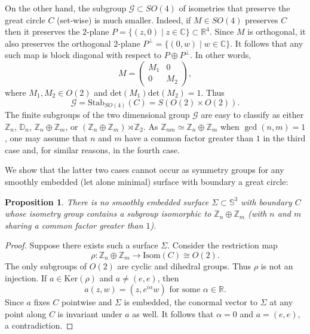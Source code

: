 \documentclass[11pt, reqno]{amsart}
\newtheorem{prop}[thm]{Proposition}
\numberwithin{equation}{section}
\begin{document}
On the other hand, the subgroup $\mathcal{G}\subset SO(4)$ of isometries that preserve the great circle $C$ (set-wise) is much smaller.   Indeed, if $M\in SO(4)$ preserves $C$ then it preserves the $2$-plane $P=\{(z,0)\;|\;z\in\mathbb{C}\}\subset\mathbb{R}^4$.  Since $M$ is orthogonal, it also preserves the orthogonal $2$-plane $P^\perp =\{(0,w)\;|\;w\in\mathbb{C}\}$.  It follows that any such map is block diagonal with respect to $P\oplus P^\perp$.  In other words, 
\begin{equation}
M =
\begin{pmatrix}
M_1 & 0 \\
0 & M_2
\end{pmatrix},
\end{equation}
where $M_1,M_2\in O(2)$ and $\mbox{det}(M_1)\mbox{det}(M_2)=1$.
Thus
\begin{equation}
\mathcal{G}=\mbox{Stab}_{SO(4)}(C) = S(O(2)\times O(2)).
\end{equation}
The finite subgroups of the two dimensional group $\mathcal{G}$ are easy to classify as either $\mathbb{Z}_n$, $\mathbb{D}_n$, $\mathbb{Z}_n\oplus\mathbb{Z}_m$, or $(\mathbb{Z}_n\oplus\mathbb{Z}_m)\rtimes\mathbb{Z}_2$.  As $\mathbb{Z}_{nm}\simeq \mathbb{Z}_n\oplus \mathbb{Z}_m$ when $\gcd(n,m)=1$, one may assume that $n$ and $m$ have a common factor greater than $1$ in the third case and, for similar reasons, in the fourth case.

We show that the latter two cases cannot occur as symmetry groups for any smoothly embedded (let alone minimal) surface with boundary a great circle:
\begin{prop}\label{symmetry}
There is no smoothly embedded surface $\Sigma\subset\mathbb{S}^3$ with boundary $C$ whose isometry group contains a subgroup isomorphic to $\mathbb{Z}_n\oplus\mathbb{Z}_m$ (with $n$ and $m$ sharing a common factor greater than $1$).
\end{prop}
\begin{proof}
Suppose there exists such a surface $\Sigma$.  Consider the restriction map
\begin{equation}
\rho: \mathbb{Z}_n\oplus\mathbb{Z}_m\to \mbox{Isom}(C)\cong O(2).
\end{equation}
The only subgroups of $O(2)$ are cyclic and dihedral groups.  Thus $\rho$ is not an injection.  If $a\in\mbox{Ker}(\rho)$ and $a\neq (e,e)$, then
\begin{equation}
a(z,w) = (z,e^{i\alpha}w)\mbox{ for some } \alpha\in\mathbb{R}.
\end{equation}
Since $a$ fixes $C$ pointwise and $\Sigma$ is embedded, the conormal vector to $\Sigma$ at any point along $C$ is invariant under $a$ as well.  It follows that $\alpha =0$ and $a=(e,e)$, a contradiction.
\end{proof}
\end{document}
